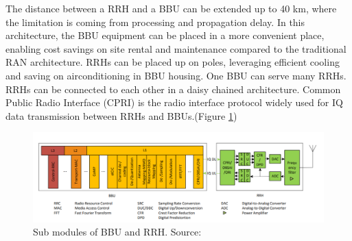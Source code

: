 \documentclass[notitlepage,hidelinks]{article}
\begin{document}
The distance between a RRH and a BBU can be extended up to 40 km,
where the limitation is coming from processing and propagation delay.
In this architecture, the BBU equipment can be placed in a more 
convenient place, enabling cost savings on site rental and 
maintenance compared to the traditional RAN architecture. 
RRHs can be placed up on poles, leveraging efficient cooling and
saving on airconditioning in BBU housing. One BBU can serve many
RRHs. RRHs can be connected to each other in a daisy chained 
architecture. Common Public Radio Interface (CPRI) is the 
radio interface protocol widely used for IQ data transmission
between RRHs and BBUs.(Figure \ref{fig:RRH_BBU_CRAN})\nocite{checko14}



\begin{figure}[!h]
  \includegraphics[width=\linewidth]{res/RRH_BBU_CRAN.PNG}
    \caption{Sub modules of BBU and RRH. Source: \parencite{checko14}}
  \label{fig:RRH_BBU_CRAN}
\end{figure}
\end{document}
